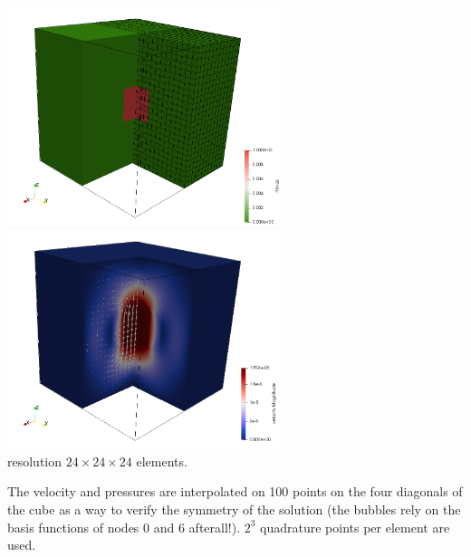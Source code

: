 \begin{center}
\includegraphics[width=8cm]{python_codes/fieldstone_82/RESULTS/bench4/rho}
\includegraphics[width=8cm]{python_codes/fieldstone_82/RESULTS/bench4/vel}\\
{\captionfont resolution $24\times 24 \times 24$ elements.}
\end{center}

The velocity and pressures are interpolated on 100 points on the four diagonals of the cube
as a way to verify the symmetry of the solution (the bubbles rely on the basis 
functions of nodes 0 and 6 afterall!). $2^3$ quadrature points per element are used. 


